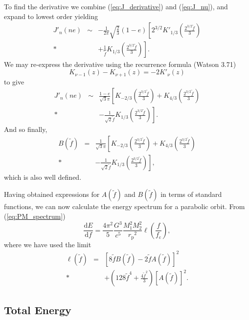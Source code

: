 \documentclass[aps,prd,reprint,showpacs,groupedaddress]{revtex4-1}
\newcommand{\eqnref}[1]{(\ref{eq:#1})}
\newcommand{\sub}[1]{\ensuremath{_\text{#1}}}
\newcommand{\dd}{\ensuremath{\mathrm{d}}}
\newcommand{\diff}[2]{\ensuremath{\frac{\dd {#1}}{\dd {#2}}}}
\newcommand{\recip}[1]{\ensuremath{\frac{1}{#1}}}
\begin{document}
To find the derivative we combine \eqnref{J_derivative} and \eqnref{J_nu}, and expand to lowest order yielding
\begin{eqnarray}
J'_n(ne) & \sim & -\frac{1}{2\pi}\sqrt{\frac{2}{3}}(1-e)\left[2^{3/2}K'_{1/3}\left(\frac{2^{3/2}\tilde{f}}{3}\right) \right. \nonumber \\*
 & & \left. + \recip{\tilde{f}}K_{1/3}\left(\frac{2^{3/2}\tilde{f}}{3}\right)\right].
\end{eqnarray}
We may re-express the derivative using the recurrence formula (Watson\cite{Watson1995} 3.71)
\begin{equation}
K_{\nu-1}(z) - K_{\nu+1}(z) = -2K'_\nu(z)
\end{equation}
to give
\begin{eqnarray}
J'_n(ne) & \sim & \frac{1-e}{\sqrt{3}\pi}\left[K_{-2/3}\left(\frac{2^{3/2}\tilde{f}}{3}\right) + K_{4/3}\left(\frac{2^{3/2}\tilde{f}}{3}\right) \right. \nonumber \\*
 & & \left. - \recip{\sqrt{2}\tilde{f}}K_{1/3}\left(\frac{2^{3/2}\tilde{f}}{3}\right)\right].
\end{eqnarray}
And so finally,
\begin{eqnarray}
B(\tilde{f}) & = & \recip{\sqrt{3}\pi}\left[K_{-2/3}\left(\frac{2^{3/2}\tilde{f}}{3}\right) + K_{4/3}\left(\frac{2^{3/2}\tilde{f}}{3}\right) \right. \nonumber \\*
 & & \left. - \recip{\sqrt{2}\tilde{f}}K_{1/3}\left(\frac{2^{3/2}\tilde{f}}{3}\right)\right],
\end{eqnarray}
which is also well defined.

Having obtained expressions for $A(\tilde{f})$ and $B(\tilde{f})$ in terms of standard functions, we can now calculate the energy spectrum for a parabolic orbit. From \eqnref{PM_spectrum}
\begin{equation}
\diff{E}{f} = \frac{4\pi^2}{5}\frac{G^3}{c^5}\frac{M_1^2M_2^2}{r\sub{p}^2}\ell\left(\frac{f}{f\sub{c}}\right),
\label{eq:PM_dEdf}
\end{equation}
where we have used the limit
\begin{eqnarray}
\ell(\tilde{f}) & = & \left[8\tilde{f}B(\tilde{f}) - 2\tilde{f}A(\tilde{f})\right]^2 \nonumber \\*
 & & + \left(128\tilde{f}^4 + \frac{4\tilde{f}^2}{3}\right)\left[A(\tilde{f})\right]^2.
\end{eqnarray}

\subsection{Total Energy}
\end{document}
